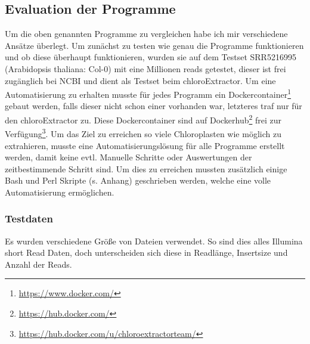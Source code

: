 \documentclass{scrartcl}
\begin{document}
\subsection{Evaluation der Programme}
\label{sec-3-1}
Um die oben genannten Programme zu vergleichen habe ich mir verschiedene Ansätze überlegt.
Um zunächst zu testen wie genau die Programme funktionieren und ob diese überhaupt funktionieren,
wurden sie auf dem Testset SRR5216995 (Arabidopsis thaliana: Col-0) mit eine Millionen reads getestet, 
dieser ist frei zugänglich bei NCBI und dient als Testset beim chloroExtractor\footnotemark[15]{}. Um eine 
Automatisierung zu erhalten musste für jedes Programm ein Dockercontainer\footnote{\url{https://www.docker.com/}} gebaut werden, falls dieser nicht 
schon einer vorhanden war, letzteres traf nur für den chloroExtractor zu. Diese Dockercontainer sind auf Dockerhub\footnote{\url{https://hub.docker.com/}} frei
zur Verfügung\footnote{\url{https://hub.docker.com/u/chloroextractorteam/}}. Um das Ziel zu erreichen
so viele Chloroplasten wie möglich zu extrahieren, musste eine Automatisierungslösung für alle Programme
erstellt werden, damit keine evtl. Manuelle Schritte oder Auswertungen der zeitbestimmende Schritt sind.
Um dies zu erreichen mussten zusätzlich einige Bash und Perl Skripte (s. Anhang) geschrieben werden, welche eine volle
Automatisierung ermöglichen.   

\subsubsection{Testdaten}
\label{sec-3-1-1}
Es wurden verschiedene Größe von Dateien verwendet. So sind dies alles Illumina short Read Daten, doch unterscheiden sich diese in Readlänge, Insertsize und Anzahl der Reads.
\end{document}
